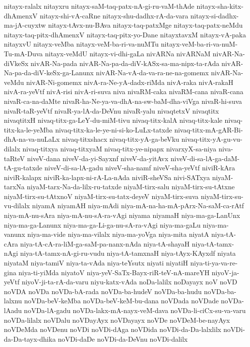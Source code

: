 {nitayx-ralalx
nitayxru
nitayx-saM-taq-patx-nA-gi-ru-vaM-thAde
nitayx-sha-kitx-dhAmenxV
nitayx-shi-vA-caRne
nitayx-shu-dadhx-rA-da-vara
nitayx-si-dadhx-ma-jA-cuyxtw
nitayx-tAvx-nu-BAva
nitayx-taq-patxMge
nitayx-taq-patx-neMdu
nitayx-taq-pitx-dhAmenxV
nitayx-taq-pitx-yo-Dane
nitayxtavxM
nitayx-vA-paka
nitayxvU
nitayx-veMba
nitayx-veM-ba-ri-va-nuMTu
nitayx-veM-ba-ri-va-nuM-Tu-mA-Duva
nitayx-veMdU
nitayx-vi-dhi-gaLa
nivARNa
nivARNaM
nivAR-Na-diVkeSx
nivAR-Na-pada
nivAR-Na-pa-da-diV-kASx-sa-ma-nipx-ta-rAda
nivAR-Na-pa-da-diV-keSx-ga-Lanunx
nivAR-Na-vA-da-va-ra-ne-na-gomemx
nivAR-Na-veMdu
nivAR-Ni-gomemx
nivA-ra-Ne-yA-dadx-riMda
nivA-raka
nivA-rakaH
nivA-ra-yeVtf
nivA-risi
nivA-ri-suva
niva
nivaRM-caka
nivaRM-cana
nivaR-cana
nivaR-ca-na-daMte
nivaR-ha-Ne-ya-va-dhA-na-sw-baM-dha-viVga
nivaR-hi-suva
nivaR-taR-yeVtf
nivaR-ya-lA-da-DeVnu
nivaR-yalu
nivaqtetxV
nivaqtitx
nivaqtitxH
nivaq-titx-ga-LeY-du-miM-tivu
nivaq-titx-kalA
nivaq-titx-kale
nivaq-titx-ka-le-yeMba
nivaq-titx-ka-le-ye-ni-si-ko-LuLx-tatxde
nivaq-titx-mA-gAR-Bi-dhA-na-va-nuLaLx
nivaq-titxshacx
nivaq-titx-yA-ga-beVku
nivaq-titx-yA-gu-vu-dilalx
nivaq-titxya
nivaq-titxyaM
nivaq-titx-ye-nipapx
nivarxyX-sa-niya
niva-taRteV
niveV-dana
niveV-da-yi-Sayxnf
niveV-da-yitAvx
niveV-di-sa-lA-ga-daM-tA-gu-tatxde
niveV-di-sa-lA-gadu
niveV-sha-namf
niveV-sha-yeVtf
niviR-kAra
niviR-kalapx
niviR-ka-lapx-ni-rA-La-nAda
niviR-sheVSa
nivi-SATxya
niyaM-tarxNa
niyaM-tarx-Na-da-lilx-ru-tatxde
niyaM-tirx-salu
niyaM-tirx-su-tAtxne
niyaM-tirx-su-tAtxnoV
niyaM-tirx-su-tatx-deyeV
niyaM-tirx-suva
niyaM-tirx-su-vu-dilalx
niyamA
niyamAH
niya-mAdi
niya-mA-na-ha-mA-pArx-Na-saM-ca-rAtf
niya-mA-nu-sAra
niya-mA-nu-sA-ra-vAgi
niyama
niyamaH
niya-ma-ga-LanUnx
niya-ma-ga-Lanunx
niya-ma-ga-Li-ga-nu-sA-ra-vAgi
niya-ma-gaLu
niya-ma-vanunx
niya-ma-vide
niya-ma-vilalx
niya-ma-yoVga
niya-mita
niyatA
niya-tA-cAra
niya-tA-cA-ra-liM-ga-saM-pa-nanx-nAda
niya-tA-shayaH
niya-tA-tamx-nAgi
niya-tA-tamx-nA-gi-ru-vudu
niya-tA-tamxnaH
niya-tAyx-KAyxdf
niyata
niyataM
niya-tamiV
niya-ta-vAda
niya-teYsutx
niyati
niyatiH
niya-ti-ya-va-re-gina
niya-ti-yiMda
niyatoV
niya-yeV-SaTx-Bayx-riR-teV-nA-mareYH
niyoV-ja-yeVtf
niyoV-ji-ta-rA-da-varu
niyu-katx-vAda
noDa-lalilx
noDayayx
noV
noVD
noVDA
noVDa
noVDa-bA-rada
noVDa-ba-hudeV
noVDa-ba-hudu
noVDa-ba-lalxnu
noVDa-beV-keMba
noVDa-beV-keM-bu-dana
noVDada
noVDade
noVDa-lAadu
noVDa-lA-gadu
noVDa-lakx-mA-nayx-veM-dava
noVDa-li-ciCx-su-va-varu
noVDa-lilalx
noVDalu
noVDayAyx
noVDayayx
noVDe
noVDeM-be-nayAyx
noVDeMda
noVDenu
noVDi
noVDi-dAga
noVDida
noVDi-da-Da-lalxlilx
noVDi-da-Da-tayx-dhika
noVDi-daDe
noVDi-da-DeVnu
noVDi-dalilx
}
